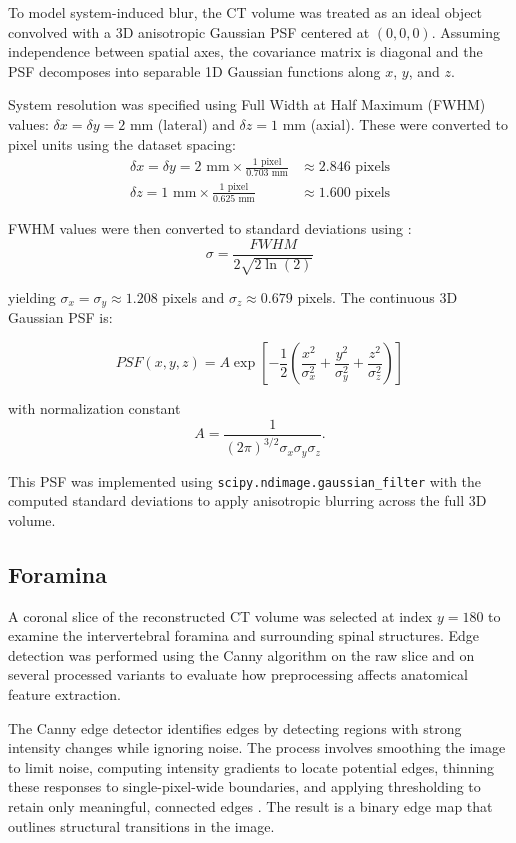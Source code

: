 \documentclass[10pt, twocolumn]{article}
\begin{document}
To model system-induced blur, the CT volume was treated as an ideal object convolved with a 3D anisotropic Gaussian PSF centered at $(0,0,0)$. Assuming independence between spatial axes, the covariance matrix is diagonal and the PSF decomposes into separable 1D Gaussian functions along $x$, $y$, and $z$.

System resolution was specified using Full Width at Half Maximum (FWHM) values: $\delta x = \delta y = 2$ mm (lateral) and $\delta z = 1$ mm (axial). These were converted to pixel units using the dataset spacing:
\begin{align*}
\delta x = \delta y = 2 \text{ mm} \times \frac{1 \text{ pixel}}{0.703 \text{ mm}} &\approx 2.846 \text{ pixels} \\
\delta z = 1 \text{ mm} \times \frac{1 \text{ pixel}}{0.625 \text{ mm}} &\approx 1.600 \text{ pixels}
\end{align*}

FWHM values were then converted to standard deviations using \cite{weissteinGaussianFunction}:
\begin{equation}
\sigma = \frac{FWHM}{2\sqrt{2\ln(2)}}
\end{equation}

yielding $\sigma_x = \sigma_y \approx 1.208$ pixels and $\sigma_z \approx 0.679$ pixels. The continuous 3D Gaussian PSF is:

\begin{equation}
PSF(x,y,z) = A \exp\left[-\frac{1}{2}\left(\frac{x^2}{\sigma_x^2} + \frac{y^2}{\sigma_y^2} + \frac{z^2}{\sigma_z^2}\right)\right]
\end{equation}

with normalization constant
$$
A = \frac{1}{(2\pi)^{3/2}\sigma_x\sigma_y\sigma_z}.
$$

This PSF was implemented using \texttt{scipy.ndimage.gaussian\_filter} with the computed standard deviations to apply anisotropic blurring across the full 3D volume.

\subsection{Foramina}
A coronal slice of the reconstructed CT volume was selected at index $y = 180$ to examine the intervertebral foramina and surrounding spinal structures. Edge detection was performed using the Canny algorithm on the raw slice and on several processed variants to evaluate how preprocessing affects anatomical feature extraction.

The Canny edge detector identifies edges by detecting regions with strong intensity changes while ignoring noise. The process involves smoothing the image to limit noise, computing intensity gradients to locate potential edges, thinning these responses to single-pixel-wide boundaries, and applying thresholding to retain only meaningful, connected edges \cite{OpenCVCannyEdge}. The result is a binary edge map that outlines structural transitions in the image.
\end{document}
